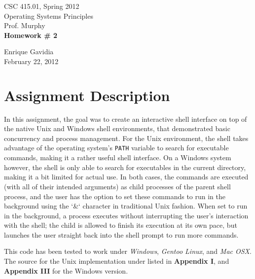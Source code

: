 \documentclass[12pt]{article}
\def \name       {Enrique Gavidia}
\def \coursenum  {CSC 415.01}
\def \coursename {Operating Systems Principles}
\def \instructor {Prof. Murphy}
\def \semester   {Spring 2012}
\def \assignment {Homework \# 2}
\def \duedate    {February 22, 2012}
\begin{document}
\begin{titlepage}
  \begin{center}

    \LARGE{\coursenum, \semester \\ \coursename}\\
    \Large{\instructor}\\

    \vfill
    \textbf{\Huge \assignment}\\
    \vfill
    
    \Large{\name}\\ 
    \large{\duedate}
    
  \end{center}
\end{titlepage}


\section*{Assignment Description}
In this assignment, the goal was to create an interactive shell interface on top of the native Unix and Windows shell environments, that
demonstrated basic concurrency and process management. For the Unix environment, the shell takes advantage of the operating system's 
\texttt{PATH} variable to search for executable commands, making it a rather useful shell interface. On a Windows system however, the shell 
is only able to search for executables in the current directory, making it a bit limited for actual use. In both cases, the commands are 
executed (with all of their intended arguments) as child processes of the parent shell process, and the user has the option to set these commands 
to run in the background using the `\&` character in traditional Unix fashion. When set to run in the background, a process executes without 
interrupting the user's interaction with the shell; the child is allowed to finish its execution at its own pace, but launches the user straight 
back into the shell prompt to run more commands. 

This code has been tested to work under \textsl{Windows}, \textsl{Gentoo Linux}, and \textsl{Mac OSX}. 
The source for the Unix implementation under listed in \textbf{Appendix I}, and \textbf{Appendix III} for the Windows version.
\end{document}
